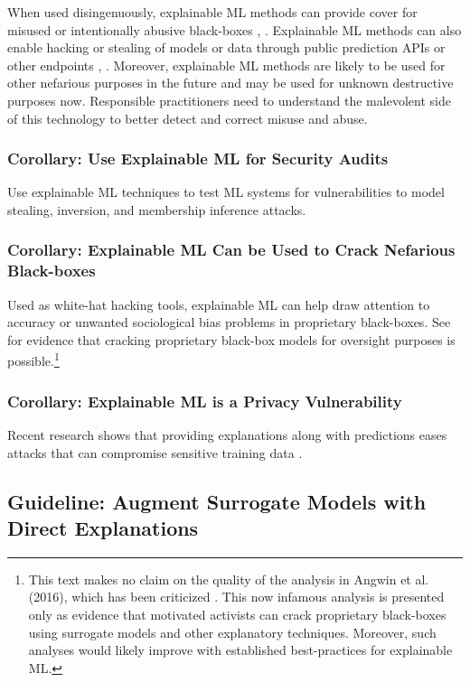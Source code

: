 \documentclass{article}
\begin{document}
When used disingenuously, explainable ML methods can provide cover for misused or intentionally abusive black-boxes \cite{fair_washing}, \cite{please_stop}. Explainable ML methods can also enable hacking or stealing of models or data through public prediction APIs or other endpoints \cite{membership_inference}, \cite{model_stealing}. Moreover, explainable ML methods are likely to be used for other nefarious purposes in the future and may be used for unknown destructive purposes now. Responsible practitioners need to understand the malevolent side of this technology to better detect and correct misuse and abuse.

\subsubsection{Corollary: Use Explainable ML for Security Audits} Use explainable ML techniques to test ML systems for vulnerabilities to model stealing, inversion, and membership inference attacks.

\subsubsection{Corollary: Explainable ML Can be Used to Crack Nefarious Black-boxes} Used as white-hat hacking tools, explainable ML can help draw attention to accuracy or unwanted sociological bias problems in proprietary black-boxes. See \citet{angwin16} for evidence that cracking proprietary black-box models for oversight purposes is possible.\footnote{\scriptsize{This text makes no claim on the quality of the analysis in Angwin et al. (2016), which has been criticized \cite{flores2016false}. This now infamous analysis is presented only as evidence that motivated activists can crack proprietary black-boxes using surrogate models and other explanatory techniques. Moreover, such analyses would likely improve with established best-practices for explainable ML.}}

\subsubsection{Corollary: Explainable ML is a Privacy Vulnerability} Recent research shows that providing explanations along with predictions eases attacks that can compromise sensitive training data \cite{shokri2019privacy}.

\subsection{Guideline: Augment Surrogate Models with Direct Explanations}
\end{document}
